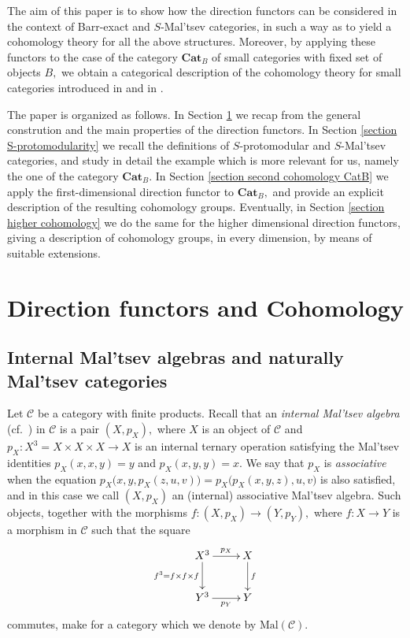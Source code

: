 \documentclass[11pt]{amsart}
\theoremstyle{plain}
\theoremstyle{definition}
\theoremstyle{remark}
\begin{document}
The aim of this paper is to show how the direction functors can be considered in the context of Barr-exact and $S$-Mal'tsev categories, in such a way as to yield a cohomology theory for all the above structures. Moreover, by applying these functors to the case of the category $\mathbf{Cat}_B$ of small categories with fixed set of objects $B,$ we obtain a categorical description of the cohomology theory for small categories introduced in \cite{cocat} and in \cite{golasinski}.

The paper is organized as follows. In Section \ref{section direction functors} we recap from \cite{baer-sums, bourn-rodelo} the general constrution and the main properties of the direction functors. In Section \ref{section S-protomodularity} we recall the definitions of $S$-protomodular and $S$-Mal'tsev categories, and study in detail the example which is more relevant for us, namely the one of the category $\mathbf{Cat}_B.$ In Section \ref{section second cohomology CatB} we apply the first-dimensional direction functor to $\mathbf{Cat}_B,$ and provide an explicit description of the resulting cohomology groups. Eventually, in Section \ref{section higher cohomology} we do the same for the higher dimensional direction functors, giving a description of cohomology groups, in every dimension, by means of suitable extensions.


\section{Direction functors and Cohomology} \label{section direction functors}
\label{sec:direction}
\subsection{Internal Mal'tsev algebras and naturally Mal'tsev categories}
Let $\mathcal{C}$ be a category with finite products. Recall that an \emph{internal Mal'tsev algebra} (cf.~\cite{smith}) in $\mathcal{C}$ is a pair $(X,p_X),$ where $X$ is an object of $\mathcal{C}$ and $p_X\colon X^3=X\times X\times X\rightarrow X$ is an internal ternary operation satisfying the Mal'tsev identities $p_X(x,x,y)=y$ and $p_X(x,y,y)=x.$ We say that $p_X$ is \emph{associative} when the equation $p_X\big(x,y,p_X(z,u,v)\big)=p_X\big(p_X(x,y,z),u,v\big)$ is also satisfied, and in this case we call $(X,p_X)$ an (internal) associative Mal'tsev algebra. Such objects, together with the morphisms $f\colon(X,p_X)\rightarrow(Y,p_Y),$ where $f\colon X\rightarrow Y$ is a morphism in $\mathcal{C}$ such that the square
\[
\xymatrix{
{X^3} \ar[d]_-{f^3=f\times f\times f} \ar[r]^-{p_X} &X \ar[d]^-f \\
{Y^3} \ar[r]_-{p_Y} &Y
}
\]
commutes, make for a category which we denote by $\mathrm{Mal}(\mathcal{C}).$
\end{document}
